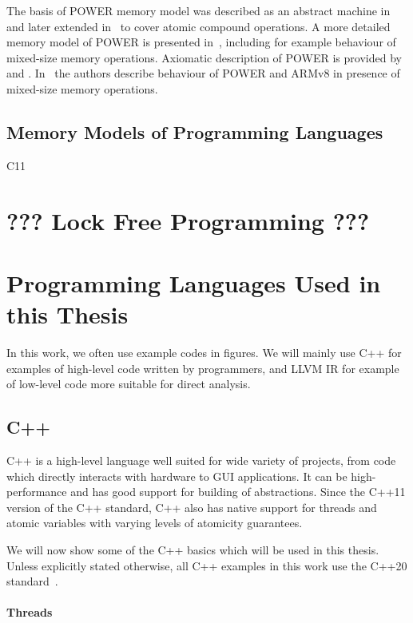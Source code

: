 The basis of POWER memory model was described as an abstract machine
in~\cite{Sarkar2011} and later extended in~\cite{Sarkar2012} to cover atomic
compound operations.
A more detailed memory model of POWER is presented in~\cite{Gray2015},
including for example behaviour of mixed-size memory operations.
Axiomatic description of POWER is provided by~\cite{MadorHaim2012} and
\cite{Alglave2010_fences}.
In~\cite{Flur2017} the authors describe behaviour of POWER and ARMv8 in
presence of mixed-size memory operations.

\subsection{Memory Models of Programming Languages}

\cite{Pulte2019:29} C11

\section{??? Lock Free Programming ???}

\section{Programming Languages Used in this Thesis}

In this work, we often use example codes in figures.
We will mainly use C++ for examples of high-level code written by programmers,
and LLVM IR for example of low-level code more suitable for direct analysis.

\subsection{C++}

C++ is a high-level language well suited for wide variety of projects, from
code which directly interacts with hardware to GUI applications.
It can be high-performance and has good support for building of abstractions.
Since the C++11 version of the C++ standard, C++ also has native support for
threads and atomic variables with varying levels of atomicity guarantees.

We will now show some of the C++ basics which will be used in this thesis.
Unless explicitly stated otherwise, all C++ examples in this work use the C++20
standard~\cite{cpp20}.

\paragraph{Threads}

